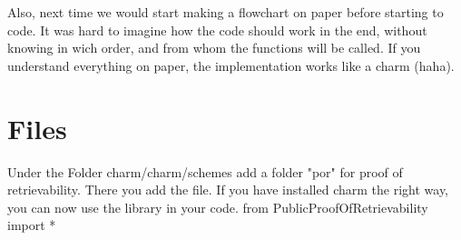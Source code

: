 \documentclass{amsart}
\begin{document}
Also, next time we would start making a flowchart on paper before starting to code. It was hard to imagine how the code should work in the end, without knowing in wich order, and from whom the functions will be called. If you understand everything on paper, the implementation works like a charm (haha).

\section{Files}
Under the Folder charm/charm/schemes add a folder "por" for proof of retrievability. There you add the file. If you have installed charm the right way, you can now use the library in your code.
from PublicProofOfRetrievability import *
\end{document}
